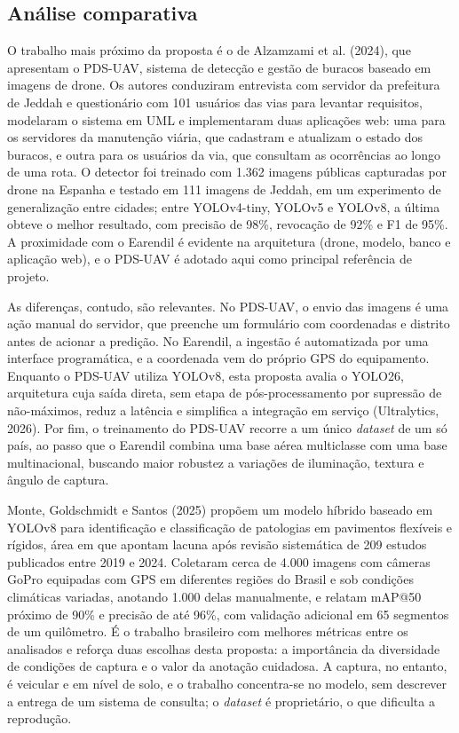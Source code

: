 \documentclass[12pt]{article}
\begin{document}
\subsection{Análise comparativa}
\label{sec:analise-comparativa}

O trabalho mais próximo da proposta é o de Alzamzami et al. (2024), que
apresentam o PDS-UAV, sistema de detecção e gestão de buracos baseado em
imagens de drone. Os autores conduziram entrevista com servidor da
prefeitura de Jeddah e questionário com 101 usuários das vias para
levantar requisitos, modelaram o sistema em UML e implementaram duas
aplicações web: uma para os servidores da manutenção viária, que
cadastram e atualizam o estado dos buracos, e outra para os usuários da
via, que consultam as ocorrências ao longo de uma rota. O detector foi
treinado com 1.362 imagens públicas capturadas por drone na Espanha e
testado em 111 imagens de Jeddah, em um experimento de generalização
entre cidades; entre YOLOv4-tiny, YOLOv5 e YOLOv8, a última obteve o
melhor resultado, com precisão de 98\%, revocação de 92\% e F1 de 95\%. A
proximidade com o Earendil é evidente na arquitetura (drone, modelo,
banco e aplicação web), e o PDS-UAV é adotado aqui como principal
referência de projeto.

As diferenças, contudo, são relevantes. No PDS-UAV, o envio das imagens é
uma ação manual do servidor, que preenche um formulário com coordenadas e
distrito antes de acionar a predição. No Earendil, a ingestão é
automatizada por uma interface programática, e a coordenada vem do
próprio GPS do equipamento. Enquanto o PDS-UAV utiliza YOLOv8, esta
proposta avalia o YOLO26, arquitetura cuja saída direta, sem etapa de
pós-processamento por supressão de não-máximos, reduz a latência e
simplifica a integração em serviço (Ultralytics, 2026). Por fim, o
treinamento do PDS-UAV recorre a um único \emph{dataset} de um só país,
ao passo que o Earendil combina uma base aérea multiclasse com uma base
multinacional, buscando maior robustez a variações de iluminação, textura
e ângulo de captura.

Monte, Goldschmidt e Santos (2025) propõem um modelo híbrido baseado em
YOLOv8 para identificação e classificação de patologias em pavimentos
flexíveis e rígidos, área em que apontam lacuna após revisão sistemática
de 209 estudos publicados entre 2019 e 2024. Coletaram cerca de 4.000
imagens com câmeras GoPro equipadas com GPS em diferentes regiões do
Brasil e sob condições climáticas variadas, anotando 1.000 delas
manualmente, e relatam mAP@50 próximo de 90\% e precisão de até 96\%, com
validação adicional em 65 segmentos de um quilômetro. É o trabalho
brasileiro com melhores métricas entre os analisados e reforça duas
escolhas desta proposta: a importância da diversidade de condições de
captura e o valor da anotação cuidadosa. A captura, no entanto, é
veicular e em nível de solo, e o trabalho concentra-se no modelo, sem
descrever a entrega de um sistema de consulta; o \emph{dataset} é
proprietário, o que dificulta a reprodução.
\end{document}
